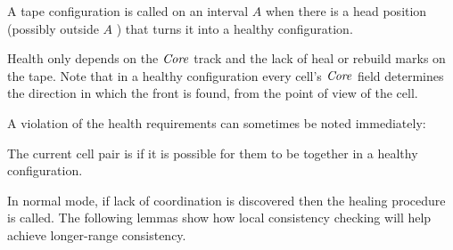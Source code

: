 \documentclass[11pt]{memoir}
\theoremstyle{definition} %
\newcommand{\fld}[1]{\ensuremath{\textit{#1\/}}}
\newcommand{\Core}{\fld{Core}}
\newcommand{\Sweep}{\fld{Sweep}}
\newcommand{\front}{\mathrm{front}}
\newcommand{\Last}{\mathrm{Last}}
\newcommand{\TransferSw}{\mathrm{TransferSw}}
\begin{document}
        





A tape configuration is called  on an interval \( A \)
when there is a head position (possibly outside \( A \) ) that turns it into a healthy configuration.

Health only depends on the \( \Core \) track
and the lack of heal or rebuild marks on the tape.
Note that in a healthy configuration every cell's \( \Core \) field
determines the direction in which the front is found, from the point of
view of the cell.

A violation of the health requirements can sometimes be noted immediately:

\begin{definition}[Coordination] \label{def:coordinated}
   The current cell pair is  
   if it is possible for them to be together in a healthy configuration.
\end{definition}

In normal mode, if lack of coordination is discovered then the healing procedure is called.
The following lemmas show 
how local consistency checking will help achieve longer-range consistency.
\end{document}
